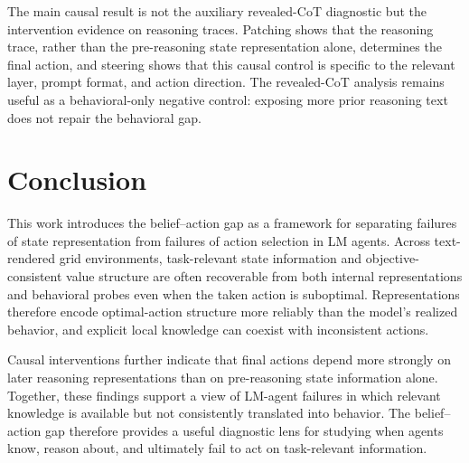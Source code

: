 \documentclass[10pt,twocolumn]{article}
\begin{document}
The main causal result is not the auxiliary revealed-CoT diagnostic but the intervention evidence on reasoning traces. Patching shows that the reasoning trace, rather than the pre-reasoning state representation alone, determines the final action, and steering shows that this causal control is specific to the relevant layer, prompt format, and action direction. The revealed-CoT analysis remains useful as a behavioral-only negative control: exposing more prior reasoning text does not repair the behavioral gap. 






\section{Conclusion}
This work introduces the belief--action gap as a framework for separating failures of state representation from failures of action selection in LM agents. Across text-rendered grid environments, task-relevant state information and objective-consistent value structure are often recoverable from both internal representations and behavioral probes even when the taken action is suboptimal. Representations therefore encode optimal-action structure more reliably than the model’s realized behavior, and explicit local knowledge can coexist with inconsistent actions.


Causal interventions further indicate that final actions depend more strongly on later reasoning representations than on pre-reasoning state information alone. Together, these findings support a view of LM-agent failures in which relevant knowledge is available but not consistently translated into behavior. The belief--action gap therefore provides a useful diagnostic lens for studying when agents know, reason about, and ultimately fail to act on task-relevant information.





%



\appendix

\end{document}
